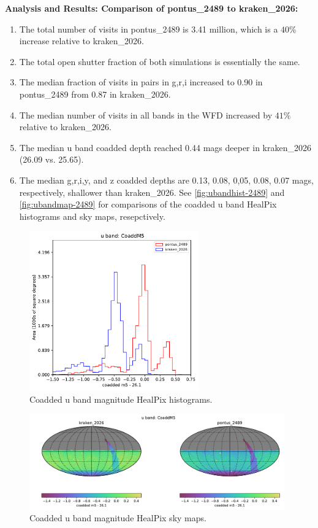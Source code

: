 \documentclass[DM,authoryear,toc]{lsstdoc}
\begin{document}
\textbf{Analysis and Results: Comparison of pontus\_2489 to kraken\_2026:}

\begin{enumerate}
\item The total number of visits in pontus\_2489 is 3.41 million, which is a $40\%$ increase relative to kraken\_2026.
\item The total open shutter fraction of both simulations is essentially the same.
\item The median fraction of visits in pairs in g,r,i increased to 0.90 in pontus\_2489 from 0.87 in kraken\_2026.
\item The median number of visits in all bands in the WFD increased by $41\%$ relative to kraken\_2026.
\item The median u band coadded depth reached 0.44 mags deeper in kraken\_2026 (26.09 vs. 25.65).
\item  The median g,r,i,y, and z coadded depths are 0.13, 0.08, 0,05, 0.08, 0.07 mags, respectively, shallower than kraken\_2026.
See \autoref{fig:ubandhist-2489} and \autoref{fig:ubandmap-2489} for comparisons of the coadded u band
HealPix histograms and sky maps, resepctively.
\end{enumerate}

\begin{figure}[ht]
\centering
\includegraphics[width=0.65\textwidth]{figures/pontus_2489_kraken_2026_CoaddM5_u_band_HEAL_ComboHistogram.pdf}
\caption{Coadded u band magnitude HealPix histograms.}
\label{fig:ubandhist-2489}
\end{figure}

\begin{figure}[ht]
\centering
\includegraphics[width=0.98\textwidth]{figures/pontus_2489_kraken_2026_CoaddM5_u_band_HEAL_ComboSkyMap.pdf}
\caption{Coadded u band magnitude HealPix sky maps.}
\label{fig:ubandmap-2489}
\end{figure}
\end{document}

